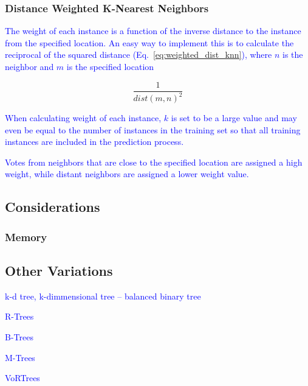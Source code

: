 \subsubsection{Distance Weighted K-Nearest Neighbors}

\textcolor{blue}{The weight of each instance is a function of the inverse distance to the instance from the specified location. An easy way to implement this is to calculate the reciprocal of the squared distance (Eq.~\ref{eq:weighted_dist_knn}), where $n$ is the neighbor and $m$ is the specified location}

\begin{equation}
{\frac{1}{{dist(m,n)}^2}}
\label{eq:weighted_dist_knn}
\end{equation}

\textcolor{blue}{When calculating weight of each instance, $k$ is set to be a large value and may even be equal to the number of instances in the training set so that all training instances are included in the prediction process.}

\textcolor{blue}{Votes from neighbors that are close to the specified location are assigned a high weight, while distant neighbors are assigned a lower weight value.}

\subsection{Considerations}


\subsubsection{Memory}

\subsection{Other Variations}

\textcolor{blue}{k-d tree, k-dimmensional tree -- balanced binary tree}

\textcolor{blue}{R-Trees}

\textcolor{blue}{B-Trees}

\textcolor{blue}{M-Trees}

\textcolor{blue}{VoRTrees}
